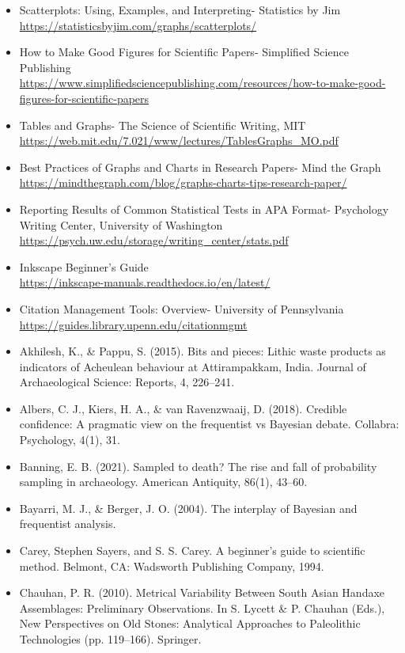 \documentclass{article}
\begin{document}
\begin{itemize}
    \item Scatterplots: Using, Examples, and Interpreting- Statistics by Jim \\
    \url{https://statisticsbyjim.com/graphs/scatterplots/}
    \item How to Make Good Figures for Scientific Papers- Simplified Science Publishing\\
\url{https://www.simplifiedsciencepublishing.com/resources/how-to-make-good-figures-for-scientific-papers}
    \item Tables and Graphs- The Science of Scientific Writing, MIT\\ \url{https://web.mit.edu/7.021/www/lectures/TablesGraphs_MO.pdf}
    \item Best Practices of Graphs and Charts in Research Papers- Mind the Graph\\ \url{https://mindthegraph.com/blog/graphs-charts-tips-research-paper/}
    \item Reporting Results of Common Statistical Tests in APA Format- Psychology Writing Center, University of Washington\\
\url{https://psych.uw.edu/storage/writing_center/stats.pdf}
    \item Inkscape Beginner's Guide\\
    \url{https://inkscape-manuals.readthedocs.io/en/latest/}
    \item Citation Management Tools: Overview- University of Pennsylvania \\
    \url{https://guides.library.upenn.edu/citationmgmt}
    \item Akhilesh, K., \& Pappu, S. (2015). Bits and pieces: Lithic waste products as indicators of Acheulean behaviour at Attirampakkam, India. Journal of Archaeological Science: Reports, 4, 226–241.
    \item Albers, C. J., Kiers, H. A., \& van Ravenzwaaij, D. (2018). Credible confidence: A pragmatic view on the frequentist vs Bayesian debate. Collabra: Psychology, 4(1), 31.
    \item Banning, E. B. (2021). Sampled to death? The rise and fall of probability sampling in archaeology. American Antiquity, 86(1), 43–60.
    \item Bayarri, M. J., \& Berger, J. O. (2004). The interplay of Bayesian and frequentist analysis.
    \item Carey, Stephen Sayers, and S. S. Carey. A beginner's guide to scientific method. Belmont, CA: Wadsworth Publishing Company, 1994.
    \item Chauhan, P. R. (2010). Metrical Variability Between South Asian Handaxe Assemblages: Preliminary Observations. In S. Lycett \& P. Chauhan (Eds.), New Perspectives on Old Stones: Analytical Approaches to Paleolithic Technologies (pp. 119–166). Springer. \\

\end{itemize}
\end{document}
